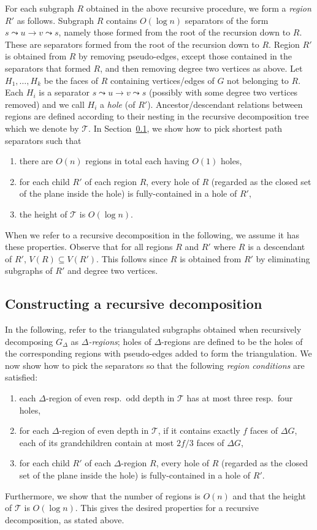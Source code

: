\documentclass[11pt]{article}
\begin{document}
For each subgraph $R$ obtained in the above recursive procedure, we form a \emph{region} $R'$ as follows. Subgraph $R$ contains $O(\log n)$ separators of the form $s\leadsto u\rightarrow v\leadsto s$, namely those formed from the root of the recursion down to $R$. These are separators formed from the root of the recursion down to $R$. Region $R'$ is obtained from $R$ by removing pseudo-edges, except those contained in the separators that formed $R$, and then removing degree two vertices as above. Let $H_1,\ldots,H_k$ be the faces of $R$ containing vertices/edges of $G$ not belonging to $R$. Each $H_i$ is a separator $s\leadsto u\rightarrow v\leadsto s$ (possibly with some degree two vertices removed) and we call $H_i$ a \emph{hole} (of $R'$). Ancestor/descendant relations between regions are defined according to their nesting in the recursive decomposition tree which we denote by $\mathcal T$. In Section~\ref{subsec:ConstructRecDecomp}, we show how to pick shortest path separators such that
\begin{enumerate}
\item there are $O(n)$ regions in total each having $O(1)$ holes,
\item for each child $R'$ of each region $R$, every hole of $R$ (regarded as the closed set of the plane inside the hole) is fully-contained in a hole of $R'$,
\item the height of $\mathcal T$ is $O(\log n)$.
\end{enumerate}
When we refer to a recursive decomposition in the following, we assume it has these properties. Observe that for all regions $R$ and $R'$ where $R$ is a descendant of $R'$, $V(R)\subseteq V(R')$. This follows since $R$ is obtained from $R'$ by eliminating subgraphs of $R'$ and degree two vertices.

\subsection{Constructing a recursive decomposition}\label{subsec:ConstructRecDecomp}
In the following, refer to the triangulated subgraphs obtained when recursively decomposing $G_\Delta$ as \emph{$\Delta$-regions}; holes of $\Delta$-regions are defined to be the holes of the corresponding regions with pseudo-edges added to form the triangulation. We now show how to pick the separators so that the following \emph{region conditions} are satisfied:
\begin{enumerate}
\item each $\Delta$-region of even resp.~odd depth in $\mathcal T$ has at most three resp.~four holes,
\item for each $\Delta$-region of even depth in $\mathcal T$, if it contains exactly $f$ faces of $\Delta G$, each of its grandchildren contain at most $2f/3$ faces of $\Delta G$,
\item for each child $R'$ of each $\Delta$-region $R$, every hole of $R$ (regarded as the closed set of the plane inside the hole) is fully-contained in a hole of $R'$.
\end{enumerate}
Furthermore, we show that the number of regions is $O(n)$ and that the height of $\mathcal T$ is $O(\log n)$. This gives the desired properties for a recursive decomposition, as stated above.
\end{document}
